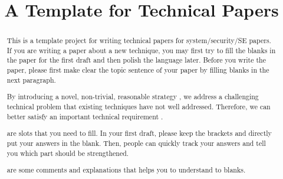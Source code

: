 \documentclass[sigconf, anonymous]{acmart}
\begin{document}
\title{A Template for Technical Papers} 
\begin{abstract}
    This is a template project for writing technical papers for system/security/SE papers. If you are writing a paper about a new technique, you may first try to fill the blanks in the paper for the first draft and then polish the language later. Before you write the paper, please first make clear the topic sentence of your paper by filling blanks in the next paragraph. 

    By introducing a novel, non-trivial, reasonable strategy \blank{}, we address a challenging technical problem \blank{} that existing techniques have not well addressed. Therefore, we can better satisfy an important technical requirement \blank{}. 

    \blank{} are slots that you need to fill. In your first draft, please keep the brackets and directly put your answers in the blank. Then, people can quickly track your answers and tell you which part should be strengthened. 

    \explain{} are some comments and explanations that helps you to understand to blanks.
\end{abstract}
\maketitle












% 



\end{document}
